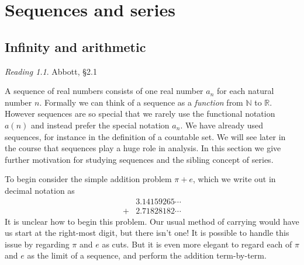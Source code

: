 \documentclass[11pt,oneside]{amsbook}
\newcommand{\N}{\mathbb N}
\newcommand{\R}{\mathbb R}
\theoremstyle{definition}
\newtheorem{exerc}{Exercise}[section]
\theoremstyle{plain}
\theoremstyle{definition}
\theoremstyle{remark}
\newtheorem*{reading}{Reading}
\numberwithin{equation}{section}
\numberwithin{figure}{section}
\begin{document}




\chapter{Sequences and series}

\section{Infinity and arithmetic}
\label{sec:sequences}

\begin{reading}
  Abbott, \S 2.1
\end{reading}

A sequence of real numbers consists of one real number $a_n$ for each natural number $n$. Formally we can think of a sequence as a \emph{function} from $\N$ to $\R$. However sequences are so special that we rarely use the functional notation $a(n)$ and instead prefer the special notation $a_n$. We have already used sequences, for instance in the definition of a countable set. We will see later in the course that sequences play a huge role in analysis. In this section we give further motivation for studying sequences and the sibling concept of series.

To begin consider the simple addition problem $\pi+e$, which we write out in decimal notation as
\begin{align*}
     &3.14159265\cdots\\
  {}+&2.71828182\cdots
\end{align*}
It is unclear how to begin this problem. Our usual method of carrying would have us start at the right-most digit, but there isn't one! It is possible to handle this issue by regarding $\pi$ and $e$ as cuts. But it is even more elegant to regard each of $\pi$ and $e$ as the limit of a sequence, and perform the addition term-by-term.
\end{document}
